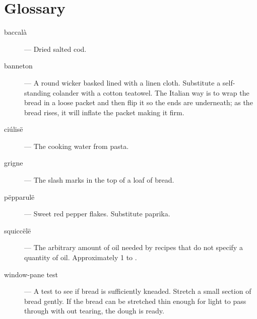 
\mainmatter



\backmatter

\chapter{Glossary}
\begin{description}
\item[baccalà]  --- Dried salted cod.
\item[banneton] --- A round wicker basked lined with a linen cloth. Substitute a self-standing colander with a cotton teatowel. The Italian way is to wrap the bread in a loose packet and then flip it so the ends are underneath; as the bread rises, it will inflate the packet making it firm.
\item[ciúlisë]  --- The cooking water from pasta.
\item[grigne]  --- The slash marks in the top of a loaf of bread.
\item[pëpparulë]  --- Sweet red pepper flakes. Substitute paprika.
\item[squiccëlë]  --- The arbitrary amount of oil needed by recipes that do not specify a quantity of oil. Approximately 1 to .
\item[window-pane test] --- A test to see if bread is sufficiently kneaded. Stretch a small section of bread gently. If the bread can be stretched thin enough for light to pass through with out tearing, the dough is ready.
\end{description}

\printindex

\appendix
